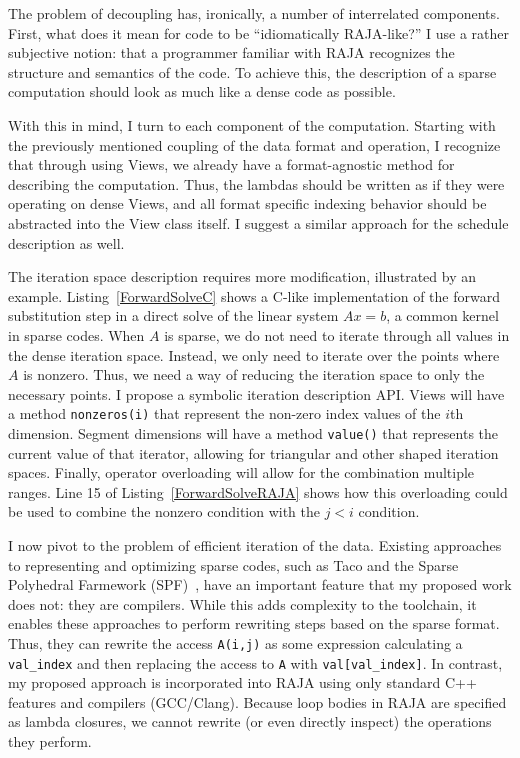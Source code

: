 \documentclass{article}
\begin{document}
The problem of decoupling has, ironically, a number of interrelated components.
First, what does it mean for code to be \enquote{idiomatically RAJA-like?}
I use a rather subjective notion: that a programmer familiar with RAJA recognizes the structure and semantics of the code. 
To achieve this, the description of a sparse computation should look as much like a dense code as possible. 

With this in mind, I turn to each component of the computation.
Starting with the previously mentioned coupling of the data format and operation, I recognize that through using Views, we already have a format-agnostic method for describing the computation. 
Thus, the lambdas should be written as if they were operating on dense Views, and all format specific indexing behavior should be abstracted into the View class itself. 
I suggest a similar approach for the schedule description as well.

The iteration space description requires more modification, illustrated by an example.
Listing~\ref{ForwardSolveC} shows a C-like implementation of the forward substitution step in a direct solve of the linear system $Ax=b$, a common kernel in sparse codes.
When $A$ is sparse, we do not need to iterate through all values in the dense iteration space.
Instead, we only need to iterate over the points where $A$ is nonzero. 
Thus, we need a way of reducing the iteration space to only the necessary points. 
I propose a symbolic iteration description API.
Views will have a method \verb.nonzeros(i). that represent the non-zero index values of the $i$th dimension. 
Segment dimensions will have a method \verb.value(). that represents the current value of that iterator, allowing for triangular and other shaped iteration spaces.
Finally, operator overloading will allow for the combination multiple ranges.
Line 15 of Listing~\ref{ForwardSolveRAJA} shows how this overloading could be used to combine the nonzero condition with the $j < i$ condition.

I now pivot to the problem of efficient iteration of the data.
Existing approaches to representing and optimizing sparse codes, such as Taco and the Sparse Polyhedral Farmework (SPF)~\cite{strout2016approach}, have an important feature that my proposed work does not: they are compilers.
While this adds complexity to the toolchain, it enables these approaches to perform rewriting steps based on the sparse format.
Thus, they can rewrite the access \verb.A(i,j). as some expression calculating a \verb.val_index. and then replacing the access to \verb.A. with \verb.val[val_index]..
In contrast, my proposed approach is incorporated into RAJA using only standard C++ features and compilers (GCC/Clang).
Because loop bodies in RAJA are specified as lambda closures, we cannot rewrite (or even directly inspect) the operations they perform.
\end{document}
